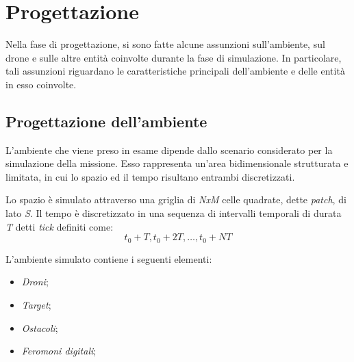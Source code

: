 \chapter{Progettazione}

Nella fase di progettazione, si sono fatte alcune assunzioni sull'ambiente, sul drone e sulle altre entità coinvolte durante la fase di simulazione.
In particolare, tali assunzioni riguardano le caratteristiche principali dell'ambiente e delle entità in esso coinvolte.

\section{Progettazione dell'ambiente}

L'ambiente che viene preso in esame dipende dallo scenario considerato per la simulazione della missione.
Esso rappresenta un'area bidimensionale strutturata e limitata, in cui lo spazio ed il tempo risultano entrambi discretizzati.

Lo spazio è simulato attraverso una griglia di \textit{NxM} celle quadrate, dette \textit{patch}, di lato \textit{S}. 
Il tempo è discretizzato in una sequenza di intervalli temporali di durata \textit{T} detti \textit{tick} definiti come:
\begin{equation*}
    t_0 + T, t_0 + 2T, \dots, t_0 + NT
\end{equation*}

L'ambiente simulato contiene i seguenti elementi: 
\begin{itemize}
    \item \textit{Droni};
    \item \textit{Target};
    \item \textit{Ostacoli};
    \item \textit{Feromoni digitali};
\end{itemize}

